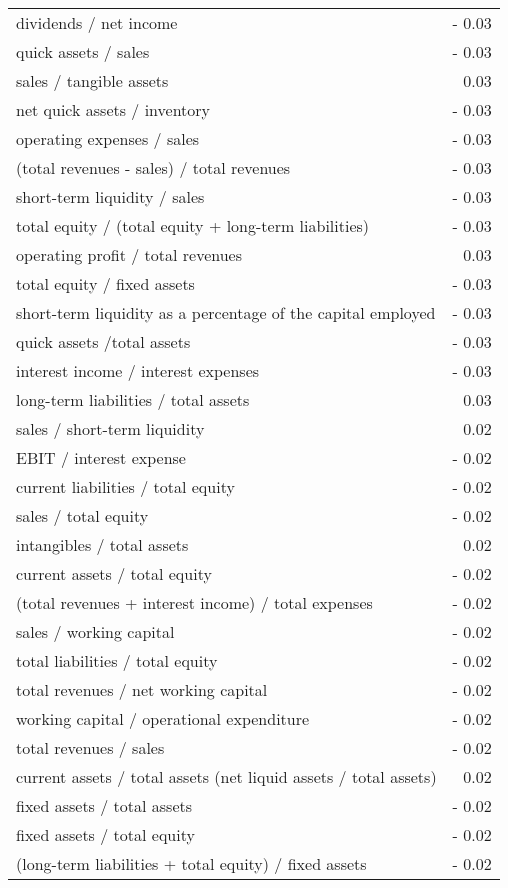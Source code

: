 \begin{longtable}{l|r}
    dividends / net income & - 0.03  \\
    quick assets / sales & - 0.03  \\
    sales / tangible assets & 0.03  \\
    net quick assets / inventory & - 0.03  \\
    operating expenses / sales & - 0.03  \\
    (total revenues - sales) / total revenues & - 0.03  \\
    short-term liquidity / sales & - 0.03  \\
    total equity / (total equity + long-term liabilities) & - 0.03  \\
    operating profit / total revenues & 0.03  \\
    total equity / fixed assets & - 0.03  \\
    short-term liquidity as a percentage of the capital employed & - 0.03  \\
    quick assets /total assets & - 0.03  \\
    interest income / interest expenses & - 0.03  \\
    long-term liabilities / total assets & 0.03  \\
    sales / short-term liquidity & 0.02  \\
    EBIT / interest expense & - 0.02  \\
    current liabilities / total equity & - 0.02  \\
    sales / total equity & - 0.02  \\
    intangibles / total assets & 0.02  \\
    current assets / total equity & - 0.02  \\
    (total revenues + interest income) / total expenses & - 0.02  \\
    sales / working capital & - 0.02  \\
    total liabilities / total equity & - 0.02  \\
    total revenues / net working capital & - 0.02  \\
    working capital / operational expenditure & - 0.02  \\
    total revenues / sales & - 0.02  \\
    current assets / total assets (net liquid assets / total assets) & 0.02  \\
    fixed assets / total assets & - 0.02  \\
    fixed assets / total equity & - 0.02  \\
    (long-term liabilities + total equity) / fixed assets & - 0.02  \\
\end{longtable}

\linespread{1.5} %
